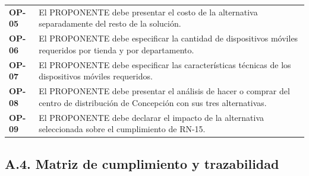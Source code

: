 \documentclass[11pt]{article}
\begin{document}
\begin{longtable}[]{@{}
  >{\raggedright\arraybackslash}p{}
  >{\raggedright\arraybackslash}p{}@{}}
\textbf{OP-05} & El PROPONENTE debe presentar el costo de la alternativa separadamente del resto de la solución. \\
\addlinespace[2pt]
\textbf{OP-06} & El PROPONENTE debe especificar la cantidad de dispositivos móviles requeridos por tienda y por departamento. \\
\addlinespace[2pt]
\textbf{OP-07} & El PROPONENTE debe especificar las características técnicas de los dispositivos móviles requeridos. \\
\addlinespace[2pt]
\textbf{OP-08} & El PROPONENTE debe presentar el análisis de hacer o comprar del centro de distribución de Concepción con sus tres alternativas. \\
\addlinespace[2pt]
\textbf{OP-09} & El PROPONENTE debe declarar el impacto de la alternativa seleccionada sobre el cumplimiento de RN-15. \\
\end{longtable}

\subsection{A.4. Matriz de cumplimiento y trazabilidad}\label{a-4-matriz-de-cumplimiento-y-trazabilidad}
\end{document}
